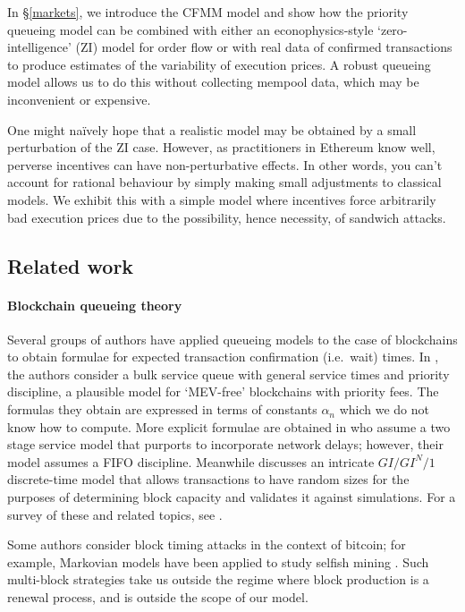 \documentclass[a4paper,11pt]{article}
\begin{document}
In \S\ref{markets}, we introduce the CFMM model and show how the priority queueing model can be combined with either an econophysics-style `zero-intelligence' (ZI) model for order flow or with real data of confirmed transactions to produce estimates of the variability of execution prices.
%
A robust queueing model allows us to do this without collecting mempool data, which may be inconvenient or expensive.

One might na\"ively hope that a realistic model may be obtained by a small perturbation of the ZI case.
%
However, as practitioners in Ethereum know well, perverse incentives can have non-perturbative effects.
%
In other words, you can't account for rational behaviour by simply making small adjustments to classical models. 
%
We exhibit this with a simple model where incentives force arbitrarily bad execution prices due to the possibility, hence necessity, of sandwich attacks.


\subsection{Related work}

\paragraph{Blockchain queueing theory}
Several groups of authors have applied queueing models to the case of blockchains to obtain formulae for expected transaction confirmation (i.e.~wait) times. 
%
In \cite{kasahara2019effect,kawasa2017transaction}, the authors consider a bulk service queue with general service times and priority discipline, a plausible model for `MEV-free' blockchains with priority fees. The formulas they obtain are expressed in terms of constants $\alpha_n$ which we do not know how to compute.
%
More explicit formulae are obtained in \cite{li2018blockchain,li2019markov} who assume a two stage service model that purports to incorporate network delays; however, their model assumes a FIFO discipline.
%
Meanwhile \cite{geissler2019discrete} discusses an intricate $GI/GI^N/1$ discrete-time model that allows transactions to have random sizes for the purposes of determining block capacity and validates it against simulations.
%
For a survey of these and related topics, see \cite{fan2020performance}.

Some authors consider block timing attacks in the context of bitcoin; for example, Markovian models have been applied to study selfish mining \cite{gobel2016bitcoin, javier2020further}.
%
Such multi-block strategies take us outside the regime where block production is a renewal process, and is outside the scope of our model.
\end{document}
